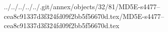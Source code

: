 ../../../../../.git/annex/objects/32/81/MD5E-s4477--cea8c91337d3f324fd09f2bb5f56670d.tex/MD5E-s4477--cea8c91337d3f324fd09f2bb5f56670d.tex